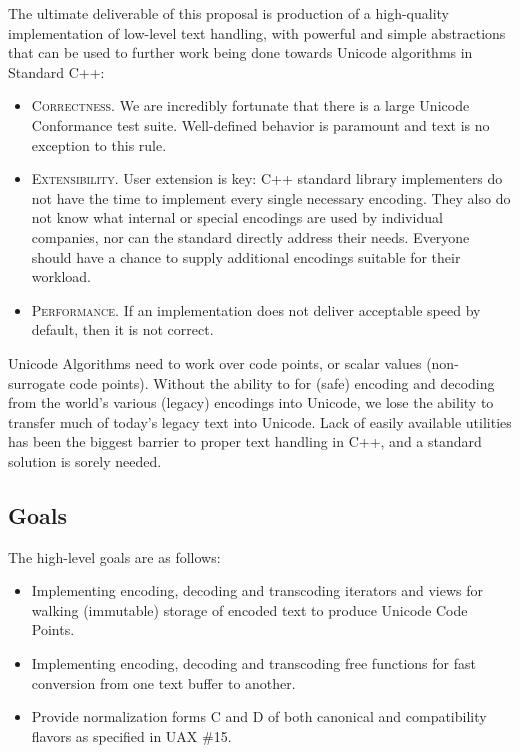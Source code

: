 \documentclass{wg21}
\begin{document}
The ultimate deliverable of this proposal is production of a high-quality implementation of low-level text handling, with powerful and simple abstractions that can be used to further work being done towards Unicode algorithms in Standard C++:

\begin{itemize}
	\item \textsc{Correctness}. We are incredibly fortunate that there is a large Unicode Conformance test suite. Well-defined behavior is paramount and text is no exception to this rule.
	\item \textsc{Extensibility}. User extension is key: C++ standard library implementers do not have the time to implement every single necessary encoding. They also do not know what internal or special encodings are used by individual companies, nor can the standard directly address their needs. Everyone should have a chance to supply additional encodings suitable for their workload.
	\item \textsc{Performance}. If an implementation does not deliver acceptable speed by default, then it is not correct.
\end{itemize}

Unicode Algorithms need to work over code points, or scalar values (non-surrogate code points). Without the ability to for (safe) encoding and decoding from the world's various (legacy) encodings into Unicode, we lose the ability to transfer much of today's legacy text into Unicode. Lack of easily available utilities has been the biggest barrier to proper text handling in C++, and a standard solution is sorely needed.

\pagebreak


\subsection{Goals}

The high-level goals are as follows:

\begin{itemize}
	\item Implementing encoding, decoding and transcoding iterators and views for walking (immutable) storage of encoded text to produce Unicode Code Points.
	\item Implementing encoding, decoding and transcoding free functions for fast conversion from one text buffer to another.
	\item Provide normalization forms C and D of both canonical and compatibility flavors as specified in UAX \#15\cite{uax_15}.
\end{itemize}
\end{document}
